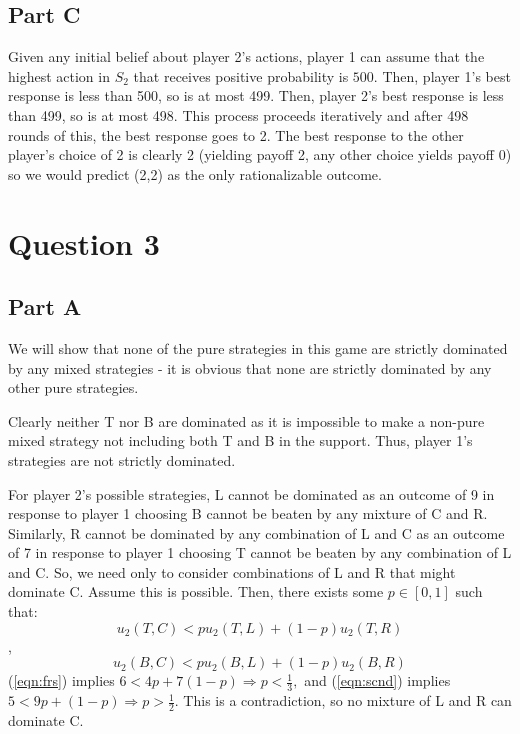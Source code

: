 \documentclass[11pt]{article} %
\begin{document}
\subsection{Part C}
Given any initial belief about player 2's actions, player 1 can assume that the highest action in $S_2$ that receives positive probability is $500.$ Then, player 1's best response is less than 500, so is at most 499. Then, player 2's best response is less than 499, so is at most 498. This process proceeds iteratively and after 498 rounds of this, the best response goes to 2. The best response to the other player's choice of 2 is clearly 2 (yielding payoff 2, any other choice yields payoff 0) so we would predict (2,2) as the only rationalizable outcome.

\section{Question 3}
\subsection{Part A}
We will show that none of the pure strategies in this game are strictly dominated by any mixed strategies - it is obvious that none are strictly dominated by any other pure strategies.

Clearly neither T nor B are dominated as it is impossible to make a non-pure mixed strategy not including both T and B in the support. Thus, player 1's strategies are not strictly dominated.

For player 2's possible strategies, L cannot be dominated as an outcome of 9 in response to player 1 choosing B cannot be beaten by any mixture of C and R. Similarly, R cannot be dominated by any combination of L and C as an outcome of 7 in response to player 1 choosing T cannot be beaten by any combination of L and C. So, we need only to consider combinations of L and R that might dominate C. Assume this is possible. Then, there exists some $p \in [0,1]$ such that:
\begin{equation}
u_2(T,C)<p u_2(T,L) + (1-p)u_2(T,R) \label{eqn:frs}
\end{equation},
\begin{equation}
u_2(B,C)<p u_2(B,L) + (1-p)u_2(B,R) \label{eqn:scnd}
\end{equation}
(\ref{eqn:frs}) implies $6<4p + 7(1-p)\Rightarrow p<\frac{1}{3},$ and (\ref{eqn:scnd}) implies $5<9p + (1-p) \Rightarrow p>\frac{1}{2}$. This is a contradiction, so no mixture of L and R can dominate C.
\end{document}
